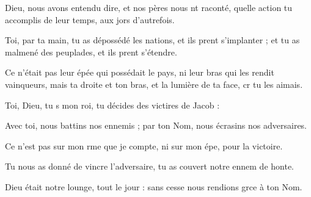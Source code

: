 \item Dieu, nous avons entendu dire,\pscross{} et nos pères nous nt raconté,\psstar{} quelle action tu accomplis de leur temps, aux jors d’autrefois.
\item Toi, par ta main, tu as dépossédé les nations,\pscross{} et ils prent s’implanter ;\psstar{} et tu as malmené des peuplades, et ils prent s’étendre.
\item Ce n’était pas leur épée qui possédait le pays,\pscross{} ni leur bras qui les rendit vainqueurs,\psstar{} mais ta droite et ton bras, et la lumière de ta face, cr tu les aimais.
\item Toi, Dieu, tu s mon roi,\psstar{} tu décides des victires de Jacob :
\item Avec toi, nous battins nos ennemis ;\psstar{} par ton Nom, nous écrasins nos adversaires.
\item Ce n’est pas sur mon rme que je compte,\psstar{} ni sur mon épe, pour la victoire.
\item Tu nous as donné de vincre l’adversaire,\psstar{} tu as couvert notre ennem de honte.
\item Dieu était notre lounge, tout le jour :\psstar{} sans cesse nous rendions grce à ton Nom.